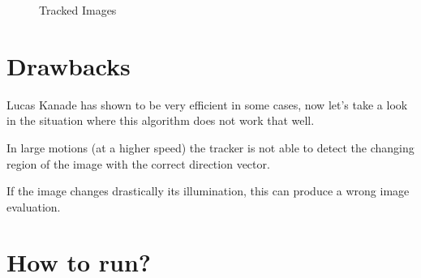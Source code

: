 \documentclass{article}
\begin{document}
\begin{figure}[H]
\centering
{}
		  \hspace{0.1cm}
		  \hspace{0.1cm}
\caption{Tracked Images}
\label{fig:original}
\end{figure}	


\section{Drawbacks}

Lucas Kanade has shown to be very efficient in some cases, now let's take a look in the situation where this algorithm does not work that well.

In large motions (at a higher speed) the tracker is not able to detect the changing region of the image with the correct direction vector.

If the image changes drastically its illumination, this can produce a wrong image evaluation.


\section{How to run?}
\end{document}
